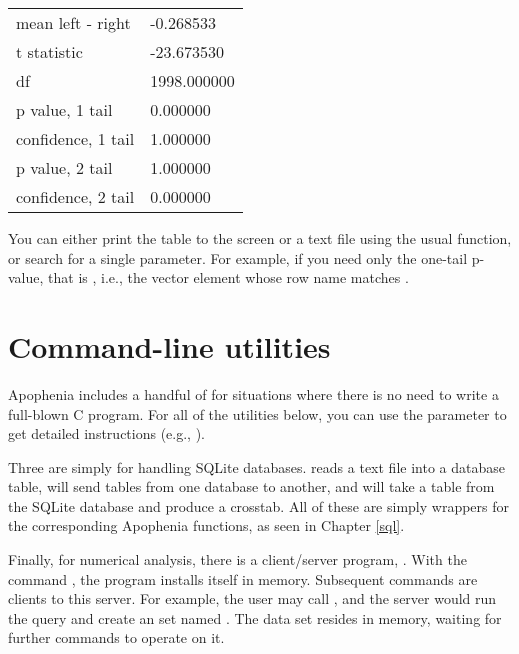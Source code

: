 \begin{center}
\begin{tabular}{|ll|}
\hline
mean left - right     &-0.268533\\
t statistic           &-23.673530\\
df                    & 1998.000000\\
p value, 1 tail       & 0.000000\\
confidence, 1 tail    & 1.000000\\
p value, 2 tail       & 1.000000\\
confidence, 2 tail    & 0.000000\\
\hline
\end{tabular}
\end{center}
\hspace\baselineskip

You can either print the table to the screen or a text file using the
usual  function, or search for a single
parameter. For example, if you need only the one-tail p-value, that is
, i.e., the vector
element whose row name matches .


\section{Command-line utilities}
Apophenia includes a handful of  for
situations where there is no need to write a full-blown C program. For
all of the utilities below, you can use the  parameter to
get detailed instructions (e.g., ).

Three are simply for handling SQLite databases.  
 reads a text file into a database table,
 will send tables from one database to
another, and
 will take a table from the SQLite
database and produce a crosstab. All of these are simply wrappers for
the corresponding Apophenia functions, as seen in Chapter \ref{sql}.

Finally, for numerical analysis, there is a client/server program,
.  With the command , the program installs itself in memory.
Subsequent commands are clients to this server. For
example, the user may call , and the server would run the query and create an
 set named . The data set resides in
memory, waiting for further commands to operate on it.

